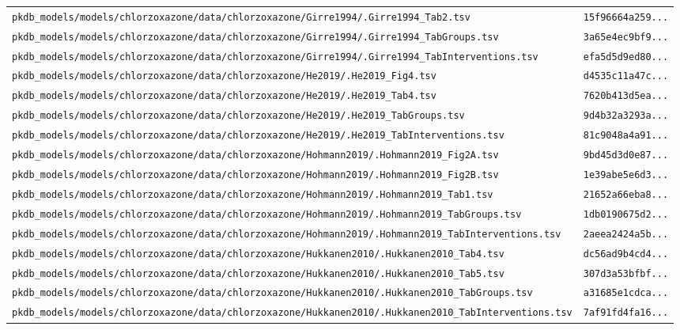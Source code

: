 \documentclass{article}
\begin{document}
\begin{longtable}{ll}
\texttt{pkdb\_models/models/chlorzoxazone/data/chlorzoxazone/Girre1994/.Girre1994\_Tab2.tsv} & \texttt{15f96664a259...} \\
\texttt{pkdb\_models/models/chlorzoxazone/data/chlorzoxazone/Girre1994/.Girre1994\_TabGroups.tsv} & \texttt{3a65e4ec9bf9...} \\
\texttt{pkdb\_models/models/chlorzoxazone/data/chlorzoxazone/Girre1994/.Girre1994\_TabInterventions.tsv} & \texttt{efa5d5d9ed80...} \\
\texttt{pkdb\_models/models/chlorzoxazone/data/chlorzoxazone/He2019/.He2019\_Fig4.tsv} & \texttt{d4535c11a47c...} \\
\texttt{pkdb\_models/models/chlorzoxazone/data/chlorzoxazone/He2019/.He2019\_Tab4.tsv} & \texttt{7620b413d5ea...} \\
\texttt{pkdb\_models/models/chlorzoxazone/data/chlorzoxazone/He2019/.He2019\_TabGroups.tsv} & \texttt{9d4b32a3293a...} \\
\texttt{pkdb\_models/models/chlorzoxazone/data/chlorzoxazone/He2019/.He2019\_TabInterventions.tsv} & \texttt{81c9048a4a91...} \\
\texttt{pkdb\_models/models/chlorzoxazone/data/chlorzoxazone/Hohmann2019/.Hohmann2019\_Fig2A.tsv} & \texttt{9bd45d3d0e87...} \\
\texttt{pkdb\_models/models/chlorzoxazone/data/chlorzoxazone/Hohmann2019/.Hohmann2019\_Fig2B.tsv} & \texttt{1e39abe5e6d3...} \\
\texttt{pkdb\_models/models/chlorzoxazone/data/chlorzoxazone/Hohmann2019/.Hohmann2019\_Tab1.tsv} & \texttt{21652a66eba8...} \\
\texttt{pkdb\_models/models/chlorzoxazone/data/chlorzoxazone/Hohmann2019/.Hohmann2019\_TabGroups.tsv} & \texttt{1db0190675d2...} \\
\texttt{pkdb\_models/models/chlorzoxazone/data/chlorzoxazone/Hohmann2019/.Hohmann2019\_TabInterventions.tsv} & \texttt{2aeea2424a5b...} \\
\texttt{pkdb\_models/models/chlorzoxazone/data/chlorzoxazone/Hukkanen2010/.Hukkanen2010\_Tab4.tsv} & \texttt{dc56ad9b4cd4...} \\
\texttt{pkdb\_models/models/chlorzoxazone/data/chlorzoxazone/Hukkanen2010/.Hukkanen2010\_Tab5.tsv} & \texttt{307d3a53bfbf...} \\
\texttt{pkdb\_models/models/chlorzoxazone/data/chlorzoxazone/Hukkanen2010/.Hukkanen2010\_TabGroups.tsv} & \texttt{a31685e1cdca...} \\
\texttt{pkdb\_models/models/chlorzoxazone/data/chlorzoxazone/Hukkanen2010/.Hukkanen2010\_TabInterventions.tsv} & \texttt{7af91fd4fa16...} \\

\end{longtable}
\end{document}
